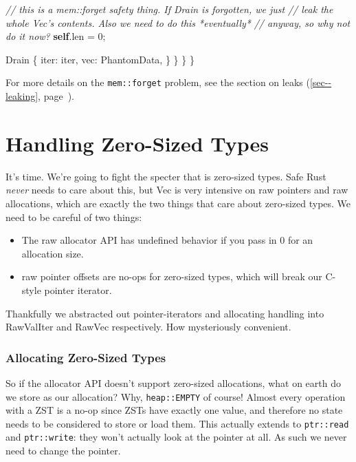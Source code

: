 \documentclass[a4paper,]{book}
\renewcommand*{\hyperlink}[2]{%
 #2 (\autoref{#1}, page~\pageref{#1})}
\newenvironment{Shaded}{\begin{snugshade}}{\end{snugshade}}
\newcommand{\KeywordTok}[1]{\textcolor[rgb]{0.13,0.29,0.53}{\textbf{{#1}}}}
\newcommand{\DecValTok}[1]{\textcolor[rgb]{0.00,0.00,0.81}{{#1}}}
\newcommand{\CommentTok}[1]{\textcolor[rgb]{0.56,0.35,0.01}{\textit{{#1}}}}
\newcommand{\NormalTok}[1]{{#1}}
\providecommand{\tightlist}{%
  \setlength{\itemsep}{0pt}\setlength{\parskip}{0pt}}
\begin{document}
\begin{Shaded}
\begin{Highlighting}[]
            \CommentTok{// this is a mem::forget safety thing. If Drain is forgotten, we just}
            \CommentTok{// leak the whole Vec's contents. Also we need to do this *eventually*}
            \CommentTok{// anyway, so why not do it now?}
            \KeywordTok{self}\NormalTok{.len = }\DecValTok{0}\NormalTok{;}

            \NormalTok{Drain \{}
                \NormalTok{iter: iter,}
                \NormalTok{vec: PhantomData,}
            \NormalTok{\}}
        \NormalTok{\}}
    \NormalTok{\}}
\NormalTok{\}}
\end{Highlighting}
\end{Shaded}

For more details on the \texttt{mem::forget} problem, see the
\protect\hyperlink{sec--leaking}{section on leaks}.

\section{Handling Zero-Sized Types}\label{sec--vec-zsts}

It's time. We're going to fight the specter that is zero-sized types.
Safe Rust \emph{never} needs to care about this, but Vec is very
intensive on raw pointers and raw allocations, which are exactly the two
things that care about zero-sized types. We need to be careful of two
things:

\begin{itemize}
\tightlist
\item
  The raw allocator API has undefined behavior if you pass in 0 for an
  allocation size.
\item
  raw pointer offsets are no-ops for zero-sized types, which will break
  our C-style pointer iterator.
\end{itemize}

Thankfully we abstracted out pointer-iterators and allocating handling
into RawValIter and RawVec respectively. How mysteriously convenient.

\subsubsection{Allocating Zero-Sized
Types}\label{allocating-zero-sized-types}

So if the allocator API doesn't support zero-sized allocations, what on
earth do we store as our allocation? Why, \texttt{heap::EMPTY} of
course! Almost every operation with a ZST is a no-op since ZSTs have
exactly one value, and therefore no state needs to be considered to
store or load them. This actually extends to \texttt{ptr::read} and
\texttt{ptr::write}: they won't actually look at the pointer at all. As
such we never need to change the pointer.
\end{document}
